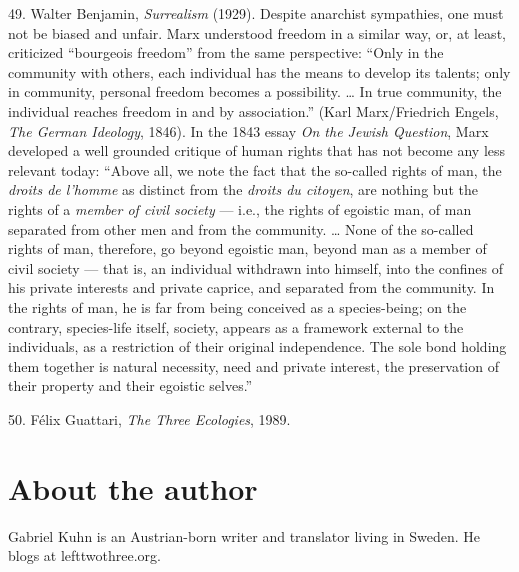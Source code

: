 {    49. Walter Benjamin, \textit{Surrealism} (1929). Despite anarchist
    sympathies, one must not be biased and unfair. Marx understood freedom in a
    similar way, or, at least, criticized “bourgeois freedom” from the same
    perspective: “Only in the community with others, each individual has the
    means to develop its talents; only in community, personal freedom becomes a
    possibility. … In true community, the individual reaches freedom in and by
    association.” (Karl Marx/Friedrich Engels, \textit{The German Ideology},
    1846). In the 1843 essay \textit{On the Jewish Question}, Marx developed a
    well grounded critique of human rights that has not become any less relevant
    today: “Above all, we note the fact that the so-called rights of man, the
    \textit{droits de l’homme} as distinct from the \textit{droits du citoyen},
    are nothing but the rights of a \textit{member of civil society} — i.e., the
    rights of egoistic man, of man separated from other men and from the
    community. … None of the so-called rights of man, therefore, go beyond
    egoistic man, beyond man as a member of civil society — that is, an
    individual withdrawn into himself, into the confines of his private
    interests and private caprice, and separated from the community. In the
    rights of man, he is far from being conceived as a species-being; on the
    contrary, species-life itself, society, appears as a framework external to
    the individuals, as a restriction of their original independence. The sole
    bond holding them together is natural necessity, need and private interest,
    the preservation of their property and their egoistic selves.”

    50. Félix Guattari, \textit{The Three Ecologies}, 1989.
}

\clearpage
\thispagestyle{empty}

\vspace*{2.5cm}
\section*{About the author}
\vspace*{4cm}

Gabriel Kuhn is an Austrian-born writer and translator living in Sweden. He
blogs at lefttwothree.org.
